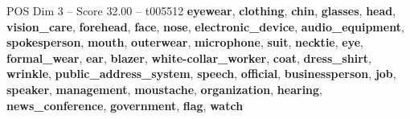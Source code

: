 \begin{textsample}{POS Dim 3 – Score 32.00 – t005512}  \label{ex:f3_pos_007}
\textbf{eyewear}, \textbf{clothing}, \textbf{chin}, \textbf{glasses}, \textbf{head}, \textbf{vision\_care}, \textbf{forehead}, \textbf{face}, \textbf{nose}, \textbf{electronic\_device}, \textbf{audio\_equipment}, \textbf{spokesperson}, \textbf{mouth}, \textbf{outerwear}, \textbf{microphone}, \textbf{suit}, \textbf{necktie}, \textbf{eye}, \textbf{formal\_wear}, \textbf{ear}, \textbf{blazer}, \textbf{white-collar\_worker}, \textbf{coat}, \textbf{dress\_shirt}, \textbf{wrinkle}, \textbf{public\_address\_system}, \textbf{speech}, \textbf{official}, \textbf{businessperson}, \textbf{job}, \textbf{speaker}, \textbf{management}, \textbf{moustache}, \textbf{organization}, \textbf{hearing}, \textbf{news\_conference}, \textbf{government}, \textbf{flag}, \textbf{watch}

\end{textsample}
